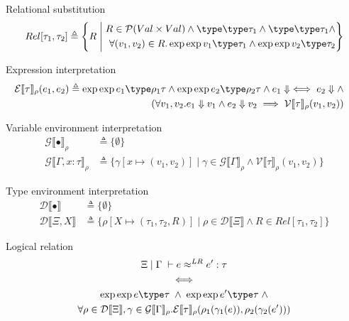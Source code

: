 \documentclass[twoside,11pt,openright]{report}
\theoremstyle{definition}
\newcommand{\var}{x}
\newcommand{\expr}{e}
\newcommand{\val}{v}
\newcommand{\Tvar}{X}
\newcommand{\typ}{\tau}
\newcommand{\venv}{\Gamma}
\newcommand{\tenv}{\Xi}
\newcommand{\empvenv}{\bullet}
\newcommand{\emptenv}{\bullet}
\def\envs#1#2\exp#3\type#4{#1 \; | \; #2 \; \vdash #3 : #4}
\def\envstyp#1#2\type#3{#1 \; | \; #2 \; \vdash #3}
\newcommand{\ValInp}[2]{\mathcal{V} \llbracket #1 \rrbracket_{#2}}
\newcommand{\ValInpGen}[2]{\ValInp{#1}{#2}(\val_1, \val_2)}
\newcommand{\ExpInp}[2]{\mathcal{E} \llbracket #1 \rrbracket_{#2}}
\newcommand{\VenvInp}[2]{\mathcal{G} \llbracket #1 \rrbracket_{#2}}
\newcommand{\TenvInp}[1]{\mathcal{D} \llbracket #1 \rrbracket}
\newcommand{\LogRel}[5]{#1 \; | \; #2 \; \vdash #3 \approx^{LR} #4 : #5}
\newcommand{\map}[2]{#1 \mapsto #2}
\begin{document}
Relational substitution
\begin{align*}
  Rel[\typ_1, \typ_2] \triangleq 
  \left\{R \; \middle\vert \;
  \begin{aligned}
    R \in \mathcal{P}(Val \times Val) \land \envstyp \emptenv \empvenv \type \typ_1 \land \envstyp \emptenv \empvenv \type \typ_1 \land\\ \forall (\val_1, \val_2) \in R . \envs \emptenv \empvenv \exp \val_1 \type \typ_1 \land \envs \emptenv \empvenv \exp \val_2 \type \typ_2
  \end{aligned}
  \right\}
\end{align*}

Expression interpretation
\begin{align*}
  \ExpInp{\typ}{\rho}(\expr_1, \expr_2) &\triangleq 
  \begin{aligned}[t]
    \envs \emptenv \empvenv \exp \expr_1 \type \rho_1{\typ} \land \envs \emptenv \empvenv \exp \expr_2 \type \rho_2{\typ} \land \expr_1 \Downarrow \iff \expr_2 \Downarrow \land\\
    (\forall \val_1, \val_2 . \expr_1 \Downarrow \val_1 \land \expr_2 \Downarrow \val_2 \implies \ValInpGen{\typ}{\rho})
  \end{aligned}
\end{align*}

Variable environment interpretation
\begin{align*}
  \VenvInp{\empvenv}{\rho} &\triangleq \{ \emptyset \}\\
  \VenvInp{\venv, \var : \typ}{\rho} &\triangleq \{\gamma[\map{\var}{(\val_1, \val_2)}] \mid \gamma \in \VenvInp{\venv}{\rho} \land \ValInpGen{\typ}{\rho}\}
\end{align*}

Type environment interpretation
\begin{align*}
  \TenvInp{\empvenv} &\triangleq \{ \emptyset \}\\
  \TenvInp{\tenv, \Tvar} &\triangleq \{\rho[\map{\Tvar}{(\typ_1, \typ_2, R)}] \mid \rho \in \TenvInp{\tenv} \land R \in Rel[\typ_1, \typ_2]\}
\end{align*}

Logical relation
\begin{equation}
  \begin{gathered}
    \LogRel{\tenv}{\venv}{\expr}{\expr'}{\typ}\\
    \iff\\
    \envs \tenv \venv \exp \expr \type \typ \; \land \; \envs \tenv \venv \exp \expr' \type \typ \; \land\\
    \forall \rho \in \TenvInp{\tenv}, \gamma \in \VenvInp{\venv}{\rho} . 
    \ExpInp{\typ}{\rho}(\rho_1(\gamma_1(\expr)), \rho_2(\gamma_2(\expr')))
  \end{gathered}
\end{equation}
\end{document}
